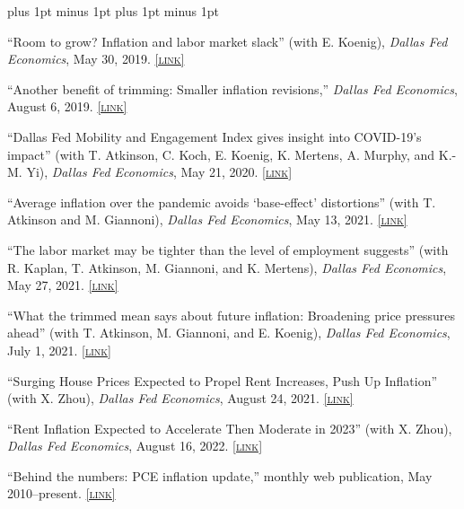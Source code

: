 \documentclass[letterpaper]{article}
\renewenvironment{itemize}{
  \begin{list}{}{
    \setlength{\leftmargin}{1.5em}
    \itemsep -1pt plus 1pt minus 1pt
    \topsep -1pt plus 1pt minus 1pt
  }
}{
  \end{list}
}
\newcommand{\link}[1]{\href{#1}{\scriptsize\textsc{[link]}}}
\begin{document}
\begin{itemize}
\item ``Room to grow? Inflation and labor market slack'' (with E. Koenig), \textit{Dallas Fed Economics}, May 30, 2019. \link{https://www.dallasfed.org/research/economics/2019/0530}

\item ``Another benefit of trimming: Smaller inflation revisions,'' \textit{Dallas Fed Economics}, August 6, 2019. \link{https://www.dallasfed.org/research/economics/2019/0806}

\item ``Dallas Fed Mobility and Engagement Index gives insight into COVID-19's impact'' (with T. Atkinson, C. Koch, E. Koenig, K. Mertens, A. Murphy, and K.-M. Yi), \textit{Dallas Fed Economics}, May 21, 2020. \link{https://www.dallasfed.org/research/economics/2020/0521}

\item ``Average inflation over the pandemic avoids `base-effect' distortions'' (with T. Atkinson and M. Giannoni), \textit{Dallas Fed Economics}, May 13, 2021. \link{https://www.dallasfed.org/research/economics/2021/0513}

\item ``The labor market may be tighter than the level of employment suggests'' (with R. Kaplan, T. Atkinson, M. Giannoni, and K. Mertens), \textit{Dallas Fed Economics}, May 27, 2021. \link{https://www.dallasfed.org/research/economics/2021/0527}

\item ``What the trimmed mean says about future inflation: Broadening price pressures ahead'' (with T. Atkinson, M. Giannoni, and E. Koenig), \textit{Dallas Fed Economics}, July 1, 2021. \link{https://www.dallasfed.org/research/economics/2021/0701}

\item ``Surging House Prices Expected to Propel Rent Increases, Push Up Inflation'' (with X. Zhou), \textit{Dallas Fed Economics}, August 24, 2021. \link{https://www.dallasfed.org/research/economics/2021/0824}

\item ``Rent Inflation Expected to Accelerate Then Moderate in 2023'' (with X. Zhou), \textit{Dallas Fed Economics}, August 16, 2022. \link{https://www.dallasfed.org/research/economics/2022/0816}

\item ``Behind the numbers: PCE inflation update,'' monthly web publication, May 2010--present.  \link{http://dallasfed.org/research/pce/inflation.cfm} 
\end{itemize}
\end{document}

